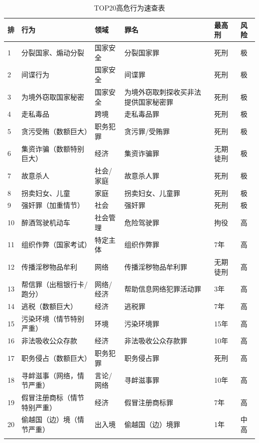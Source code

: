 \documentclass[12pt,a4paper]{article}
\begin{document}
\begin{longtable}{p{0.5cm}p{4cm}p{2cm}p{3cm}p{2cm}p{2cm}}
  \toprule
  \textbf{排} & \textbf{行为} & \textbf{领域} & \textbf{罪名} & \textbf{最高刑} & \textbf{风险} \\
  \midrule
  1 & 分裂国家、煽动分裂 & 国家安全 & 分裂国家罪 & 死刑 & 极 \\
  2 & 间谍行为 & 国家安全 & 间谍罪 & 死刑 & 极 \\
  3 & 为境外窃取国家秘密 & 国家安全 & 为境外窃取刺探收买非法提供国家秘密罪 & 死刑 & 极 \\
  4 & 走私毒品 & 跨境 & 走私毒品罪 & 死刑 & 极 \\
  5 & 贪污受贿（数额巨大） & 职务犯罪 & 贪污罪/受贿罪 & 死刑 & 极 \\
  6 & 集资诈骗（数额特别巨大） & 经济 & 集资诈骗罪 & 无期徒刑 & 极 \\
  7 & 故意杀人 & 社会/家庭 & 故意杀人罪 & 死刑 & 极 \\
  8 & 拐卖妇女、儿童 & 家庭 & 拐卖妇女、儿童罪 & 死刑 & 极 \\
  9 & 强奸罪（加重情节） & 社会 & 强奸罪 & 死刑 & 极 \\
  10 & 醉酒驾驶机动车 & 社会管理 & 危险驾驶罪 & 拘役 & 高 \\
  11 & 组织作弊（国家考试） & 特定主体 & 组织作弊罪 & 7年 & 高 \\
  12 & 传播淫秽物品牟利 & 网络 & 传播淫秽物品牟利罪 & 无期徒刑 & 高 \\
  13 & 帮信罪（出租银行卡/跑分） & 网络/经济 & 帮助信息网络犯罪活动罪 & 3年 & 高 \\
  14 & 逃税（数额巨大） & 经济 & 逃税罪 & 7年 & 高 \\
  15 & 污染环境（情节特别严重） & 环境 & 污染环境罪 & 15年 & 高 \\
  16 & 非法吸收公众存款 & 经济 & 非法吸收公众存款罪 & 10年 & 高 \\
  17 & 职务侵占（数额巨大） & 职务犯罪 & 职务侵占罪 & 死刑 & 高 \\
  18 & 寻衅滋事（网络，情节严重） & 言论/网络 & 寻衅滋事罪 & 10年 & 高 \\
  19 & 假冒注册商标（情节特别严重） & 经济 & 假冒注册商标罪 & 7年 & 高 \\
  20 & 偷越国（边）境（情节严重） & 出入境 & 偷越国（边）境罪 & 1年 & 中高 \\
  \bottomrule
  \caption{TOP20高危行为速查表}
\end{longtable}

\clearpage

\end{document}
